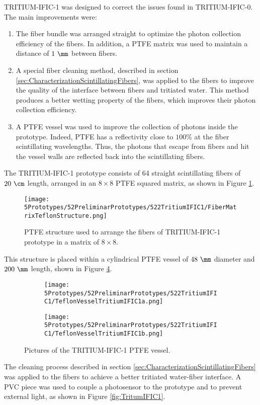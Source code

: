 TRITIUM-IFIC-1 was designed to correct the issues found in TRITIUM-IFIC-0. The main improvements were:

\begin{enumerate}

\item{} The fiber bundle was arranged straight to optimize the photon collection efficiency of the fibers. In addition, a PTFE matrix was used to maintain a distance of $1~\mm$ between fibers.

\item{} A special fiber cleaning method, described in section \ref{sec:CharacterizationScintillatingFibers}, was applied to the fibers to improve the quality of the interface between fibers and tritiated water. This method produces a better wetting property of the fibers, which improves their photon collection efficiency.

\item{} A PTFE vessel was used to improve the collection of photons inside the prototype. Indeed, PTFE has a reflectivity close to $100\%$ at the fiber scintillating wavelengths. Thus, the photons that escape from fibers and hit the vessel walls are reflected back into the scintillating fibers.

\end{enumerate}

The TRITIUM-IFIC-1 prototype consists of 64 straight scintillating fibers of $20~\cm$ length, arranged in an $8\times 8$ PTFE squared matrix, as shown in Figure \ref{fig:TeflonStructureFibersTritiumIFIC1}.
\begin{figure}[h]
\centering
\texttt{[image: 5Prototypes/52PreliminarPrototypes/522TritiumIFIC1/FiberMatrixTeflonStructure.png]}
\caption{PTFE structure used to arrange the fibers of TRITIUM-IFIC-1 prototype in a matrix of $8 \times 8$.\label{fig:TeflonStructureFibersTritiumIFIC1}}
\end{figure}
This structure is placed within a cylindrical PTFE vessel of $48~\mm$ diameter and $200~\mm$ length, shown in Figure \ref{fig:TeflonVesselTritumIFIC1}. 
\begin{figure}
\centering
    \begin{subfigure}[b]{0.30\textwidth}
    \centering
    \texttt{[image: 5Prototypes/52PreliminarPrototypes/522TritiumIFIC1/TeflonVesselTritiumIFIC1a.png]}  
    \caption{\label{subfig:TeflonVesselTritumIFIC1a}}
    \end{subfigure}
    \hfill
    \begin{subfigure}[b]{0.45\textwidth}
    \centering
    \texttt{[image: 5Prototypes/52PreliminarPrototypes/522TritiumIFIC1/TeflonVesselTritiumIFIC1b.png]}  
    \caption{\label{subfig:TeflonVesselTritumIFIC1b}}
    \end{subfigure}
 \caption{Pictures of the TRITIUM-IFIC-1 PTFE vessel.}
 \label{fig:TeflonVesselTritumIFIC1}
\end{figure}
The cleaning process described in section \ref{sec:CharacterizationScintillatingFibers} was applied to the fibers to achieve a better tritiated water-fiber interface. A PVC piece was used to couple a photosensor to the prototype and to prevent external light, as shown in Figure \ref{fig:TritumIFIC1}.

